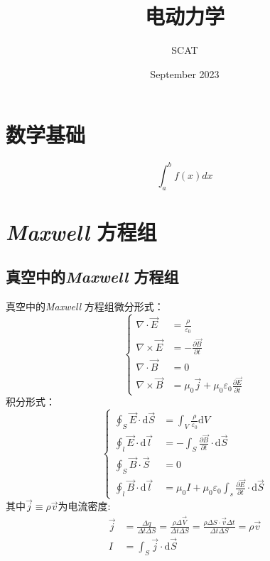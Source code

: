 \documentclass[12pt]{article}
\title{电动力学}
\author{SCAT}
\date{September 2023}
\begin{document}
\pagecolor{backgroundcolor}
\maketitle
\color[RGB]{220,220,220}
\section{数学基础}
\begin{shaded}
$$
  \int_a^b f(x) dx
$$
\end{shaded}
\section{\textit{Maxwell} 方程组}
\subsection{真空中的\textit{Maxwell} 方程组}
真空中的\textit{Maxwell }方程组微分形式：
\begin{equation}
\left\{\begin{split}
   \nabla \cdot \Vec{E}&=\frac{\rho}{\varepsilon_0} \\
   \nabla \times \Vec{E}&=-\frac{\partial \Vec{B}}{\partial t}  \\
   \nabla \cdot \Vec{B}&=0  \\
   \nabla \times \Vec{B}&=\mu_0 \Vec{j}+\mu_0\varepsilon_0\frac{\partial \Vec{E}}{\partial t}  
\end{split}\right.
\label{x1}
\end{equation}
积分形式：
\begin{equation}
    \left\{\begin{split}
    \oint_S \Vec{E}\cdot \mathrm{d}\Vec{S}&=\int_V \frac{\rho}{\varepsilon_0} \mathrm{d}V \\
   \oint_l \Vec{E}\cdot\mathrm{d}\Vec{l}&=-\int_S \frac{\partial \Vec{B}}{\partial t}\cdot \mathrm{d}\Vec{S}  \\
   \oint_S \Vec{B}\cdot \Vec{S}&=0  \\
   \oint_l \Vec{B}\cdot \mathrm{d}\Vec{l}&=\mu_0 I +\mu_0\varepsilon_0\int_s \frac{\partial \Vec{E}}{\partial t}\cdot \mathrm{d}\Vec{S}
    \end{split}\right.
\end{equation}
其中$\Vec{j}\equiv \rho\Vec{v} $为电流密度:
\begin{equation}
\begin{split}
    \Vec{j}&=\frac{\Delta q}{\Delta t\Delta S}=\frac{\rho \Delta \Vec{V}}{\Delta t\Delta S}=\frac{\rho \Delta S\cdot \Vec{v}\Delta t}{\Delta t\Delta S}=\rho\Vec{v}\\
    I&=\int_S \Vec{j}\cdot \mathrm{d}\Vec{S}
\end{split}
\end{equation}
\end{document}
